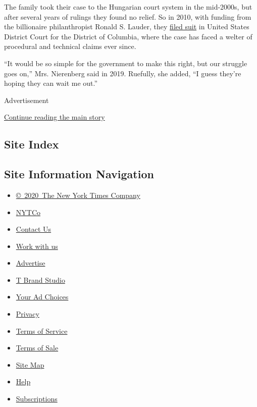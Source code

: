 The family took their case to the Hungarian court system in the
mid-2000s, but after several years of rulings they found no relief. So
in 2010, with funding from the billionaire philanthropist Ronald S.
Lauder, they
\href{http://www.hungarylootedart.com/wp-content/uploads/2010/06/Herzog_Background.pdf}{filed
suit} in United States District Court for the District of Columbia,
where the case has faced a welter of procedural and technical claims
ever since.

``It would be so simple for the government to make this right, but our
struggle goes on,'' Mrs. Nierenberg said in 2019. Ruefully, she added,
``I guess they're hoping they can wait me out.''

Advertisement

\protect\hyperlink{after-bottom}{Continue reading the main story}

\hypertarget{site-index}{%
\subsection{Site Index}\label{site-index}}

\hypertarget{site-information-navigation}{%
\subsection{Site Information
Navigation}\label{site-information-navigation}}

\begin{itemize}
\tightlist
\item
  \href{https://help.nytimes.com/hc/en-us/articles/115014792127-Copyright-notice}{©~2020~The
  New York Times Company}
\end{itemize}

\begin{itemize}
\tightlist
\item
  \href{https://www.nytco.com/}{NYTCo}
\item
  \href{https://help.nytimes.com/hc/en-us/articles/115015385887-Contact-Us}{Contact
  Us}
\item
  \href{https://www.nytco.com/careers/}{Work with us}
\item
  \href{https://nytmediakit.com/}{Advertise}
\item
  \href{http://www.tbrandstudio.com/}{T Brand Studio}
\item
  \href{https://www.nytimes.com/privacy/cookie-policy\#how-do-i-manage-trackers}{Your
  Ad Choices}
\item
  \href{https://www.nytimes.com/privacy}{Privacy}
\item
  \href{https://help.nytimes.com/hc/en-us/articles/115014893428-Terms-of-service}{Terms
  of Service}
\item
  \href{https://help.nytimes.com/hc/en-us/articles/115014893968-Terms-of-sale}{Terms
  of Sale}
\item
  \href{https://spiderbites.nytimes.com}{Site Map}
\item
  \href{https://help.nytimes.com/hc/en-us}{Help}
\item
  \href{https://www.nytimes.com/subscription?campaignId=37WXW}{Subscriptions}
\end{itemize}
